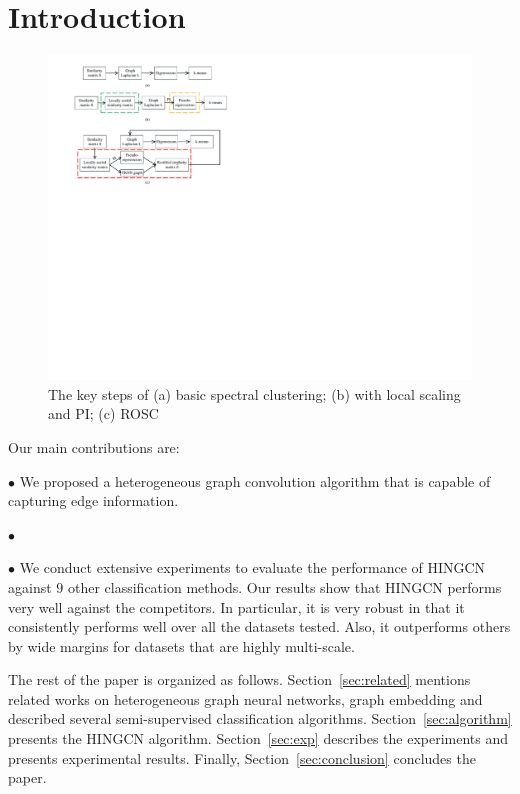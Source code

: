 \section{Introduction}
\label{sec:intro}
\begin{figure}
    \centering
        \includegraphics[width = 1.09\linewidth]{flow_graph3.pdf}
        \caption{The key steps of (a) basic spectral clustering; (b) with local scaling and PI; (c) ROSC}
        \label{figure:flow_graph}
\end{figure}



Our main contributions are:

\noindent$\bullet$
We proposed a heterogeneous graph convolution algorithm that is capable of capturing edge information.

\noindent$\bullet$

\noindent$\bullet$
We conduct extensive experiments %
to evaluate the performance of HINGCN
against $9$ other classification methods. 
Our results show that HINGCN performs very well against the competitors. 
In particular, it is very robust in that it consistently performs well over all the datasets tested. 
Also, it outperforms others by wide margins for datasets that are highly multi-scale. 

The rest of the paper is organized as follows.
Section~\ref{sec:related} mentions related works on heterogeneous graph neural networks, graph embedding and described several semi-supervised classification algorithms.
Section~\ref{sec:algorithm} presents the HINGCN algorithm.
Section~\ref{sec:exp} describes the experiments and presents experimental results.
Finally, Section~\ref{sec:conclusion} concludes the paper.



